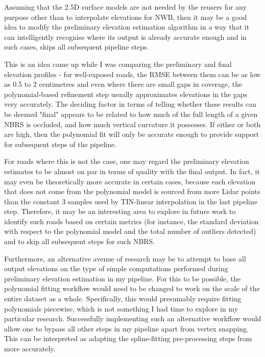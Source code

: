 Assuming that the 2.5D surface models are not needed by the reusers for any purpose other than to interpolate elevations for NWB, then it may be a good idea to modify the preliminary elevation estimation algorithm in a way that it can intelligently recognise where its output is already accurate enough and in such cases, skips all subsequent pipeline steps.

This is an idea came up while I was comparing the preliminary and final elevation profiles - for well-exposed roads, the RMSE between them can be as low as 0.5 to 2 centimetres and even where there are small gaps in coverage, the polynomial-based refinement step usually approximates elevations in the gaps very accurately. The deciding factor in terms of telling whether these results can be deemed "final" appears to be related to how much of the full length of a given NBRS is occluded, and how much vertical curvature it possesses. If either or both are high, then the polynomial fit will only be accurate enough to provide support for subsequent steps of the pipeline.

For roads where this is not the case, one may regard the preliminary elevation estimates to be almost on par in terms of quality with the final output. In fact, it may even be theoretically more accurate in certain cases, because each elevation that does not come from the polynomial model is sourced from more Lidar points than the constant 3 samples used by TIN-linear interpolation in the last pipeline step. Therefore, it may be an interesting area to explore in future work to identify such roads based on certain metrics (for instance, the standard deviation with respect to the polynomial model and the total number of outliers detected) and to skip all subsequent steps for such NBRS.

Furthermore, an alternative avenue of research may be to attempt to base all output elevations on the type of simple computations performed during preliminary elevation estimation in my pipeline. For this to be possible, the polynomial fitting workflow would need to be changed to work on the scale of the entire dataset as a whole. Specifically, this would presumably require fitting polynomials piecewise, which is not something I had time to explore in my particular research. Successfully implementing such an alternative workflow would allow one to bypass all other steps in my pipeline apart from vertex snapping. This can be interpreted as adapting the spline-fitting pre-processing steps from \cite{boyko_funkhauser_2011} more accurately.

